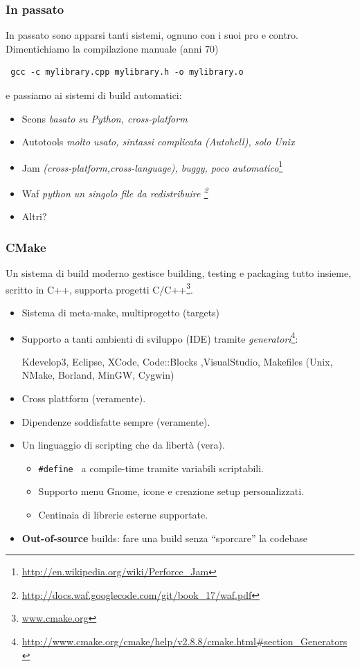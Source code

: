 \documentclass[10pt] {beamer}
\begin{document}
\begin{frame}[fragile]
\frametitle{In passato}
In passato sono apparsi tanti sistemi, ognuno con i suoi pro e contro. Dimentichiamo la compilazione manuale (anni 70)
\begin{verbatim}
 gcc -c mylibrary.cpp mylibrary.h -o mylibrary.o
\end{verbatim}
e passiamo ai sistemi di build automatici:

\begin{itemize}
\item<1-> Scons \textit{basato su Python, cross-platform}
\item<2-> Autotools \textit{ molto usato, sintassi complicata (Autohell), solo Unix }
\item<3-> Jam \textit{ (cross-platform,cross-language), buggy, poco automatico}\footnote{\url{http://en.wikipedia.org/wiki/Perforce_Jam}}
\item<4-> Waf \textit{ python un singolo file da redistribuire \footnote{\url{http://docs.waf.googlecode.com/git/book_17/waf.pdf}}}
\item<5-> Altri?
\end{itemize}
\end{frame}


\begin{frame}
\frametitle{CMake}
Un sistema di build moderno gestisce building, testing e packaging tutto insieme, scritto in C++, supporta progetti C/C++\footnote{\url{www.cmake.org}}.
\begin{itemize}
		\item<1-> Sistema di meta-make, multiprogetto (targets)
		\item<2-> Supporto a tanti ambienti di sviluppo (IDE) tramite \emph{generatori}\footnote{\url{http://www.cmake.org/cmake/help/v2.8.8/cmake.html\#section\_Generators}}: 

Kdevelop3, Eclipse, XCode, Code::Blocks ,VisualStudio, Makefiles (Unix, NMake, Borland, MinGW, Cygwin)

		\item<3-> Cross plattform (veramente).
		\item<4-> Dipendenze soddisfatte sempre (veramente).
		\item<5-> Un linguaggio di scripting che da libertà (vera).
		\begin{itemize}
			\item<6-> \texttt{\#define } a compile-time tramite variabili scriptabili.
			\item<7-> Supporto menu Gnome, icone e creazione setup personalizzati.
			\item<8-> Centinaia di librerie esterne supportate.
		\end{itemize}
		\item<9-> \textbf{Out-of-source} builds: fare una build senza ``sporcare'' la codebase
\end{itemize}
\end{frame}
\end{document}
